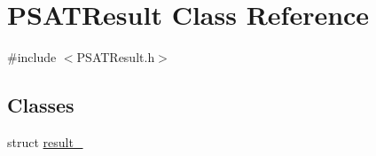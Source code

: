 \hypertarget{class_p_s_a_t_result}{}\section{P\+S\+A\+T\+Result Class Reference}
\label{class_p_s_a_t_result}


{\ttfamily \#include $<$P\+S\+A\+T\+Result.\+h$>$}

\subsection*{Classes}
\begin{DoxyCompactItemize}
\item 
struct \hyperlink{struct_p_s_a_t_result_1_1result__}{result\+\_\+}
\end{DoxyCompactItemize}
